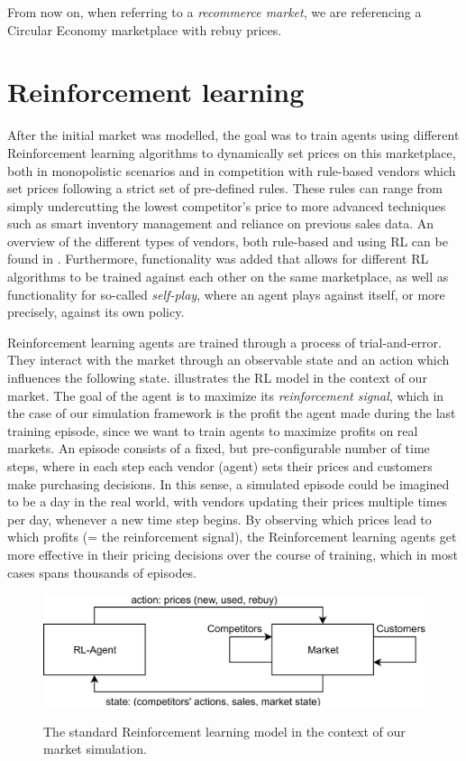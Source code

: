 From now on, when referring to a \emph{recommerce market}, we are referencing a Circular Economy marketplace with rebuy prices.

\clearpage
\section{Reinforcement learning}\label{sec:ReinforcementLearningIntroduction}

After the initial market was modelled, the goal was to train agents using different Reinforcement learning algorithms to dynamically set prices on this marketplace, both in monopolistic scenarios and in competition with rule-based vendors which set prices following a strict set of pre-defined rules. These rules can range from simply undercutting the lowest competitor's price to more advanced techniques such as smart inventory management and reliance on previous sales data. An overview of the different types of vendors, both rule-based and using RL can be found in . Furthermore, functionality was added that allows for different RL algorithms to be trained against each other on the same marketplace, as well as functionality for so-called \emph{self-play}, where an agent plays against itself, or more precisely, against its own policy.

Reinforcement learning agents are trained through a process of trial-and-error. They interact with the market through an observable state and an action which influences the following state.  illustrates the RL model in the context of our market. The goal of the agent is to maximize its \emph{reinforcement signal}, which in the case of our simulation framework is the profit the agent made during the last training episode, since we want to train agents to maximize profits on real markets. An episode consists of a fixed, but pre-configurable number of time steps, where in each step each vendor (agent) sets their prices and customers make purchasing decisions. In this sense, a simulated episode could be imagined to be a day in the real world, with vendors updating their prices multiple times per day, whenever a new time step begins. By observing which prices lead to which profits (= the reinforcement signal), the Reinforcement learning agents get more effective in their pricing decisions over the course of training, which in most cases spans thousands of episodes.

\begin{figure}[t]
	\centering
	\includegraphics[width = \textwidth]{images/RL_overview.png}\\
	\caption{The standard Reinforcement learning model in the context of our market simulation.\\ }\label{fig:IntroRLDiagram}
\end{figure}